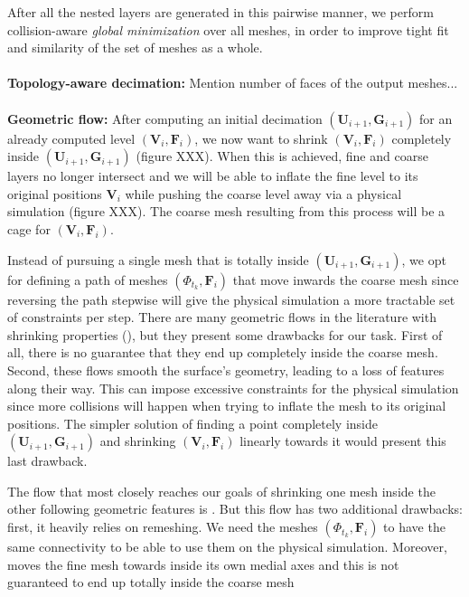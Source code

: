After all the nested layers are generated in this pairwise manner, we perform
collision-aware \emph{global  minimization} over all meshes, in order to
improve tight fit and similarity of the set of meshes as a whole. 
\\ 
\\
\textbf{Topology-aware decimation:}  Mention number
of faces of the output meshes... 
\\ 
\\ 
\textbf{Geometric flow:} After computing
an initial decimation $(\mathbf{U}_{i+1},\mathbf{G}_{i+1})$ for an already
computed level $(\mathbf{V}_{i},\mathbf{F}_{i})$, we now want to shrink
$(\mathbf{V}_{i},\mathbf{F}_{i})$ completely inside
$(\mathbf{U}_{i+1},\mathbf{G}_{i+1})$ (figure XXX). When this is achieved, fine
and coarse layers no longer intersect and we will be able to inflate the fine
level to its original positions $\mathbf{V}_{i}$ while pushing the coarse level
away via a physical simulation (figure XXX). The coarse mesh resulting from
this process will be a cage for $(\mathbf{V}_{i},\mathbf{F}_{i})$. 

Instead of pursuing a single mesh that is totally inside
$(\mathbf{U}_{i+1},\mathbf{G}_{i+1})$, we opt for defining a path of meshes
$(\Phi_{t_k},\mathbf{F}_{i})$ that move inwards the coarse mesh since reversing
the path stepwise will give the physical simulation a more tractable set of
constraints per step. There are many geometric flows in the literature with
shrinking properties (), but they present some
drawbacks for our task. First of all, there is no guarantee that they end up
completely inside the coarse mesh. Second, these flows smooth the surface's
geometry, leading to a loss of features along their way. This can impose
excessive constraints for the physical simulation since more collisions will
happen when trying to inflate the mesh to its original positions. The simpler
solution of finding a point completely inside
$(\mathbf{U}_{i+1},\mathbf{G}_{i+1})$ and shrinking
$(\mathbf{V}_i,\mathbf{F}_{i})$ linearly towards it would present this last
drawback.  

The flow that most closely reaches our goals of shrinking one mesh inside the
other following geometric features is . But this flow has
two additional drawbacks: first, it heavily relies on remeshing. We need the
meshes $(\Phi_{t_k},\mathbf{F}_{i})$ to have the same connectivity to be able
to use them on the physical simulation. Moreover,  moves
the fine mesh towards inside its own medial axes and this is not guaranteed to
end up totally inside the coarse mesh  

